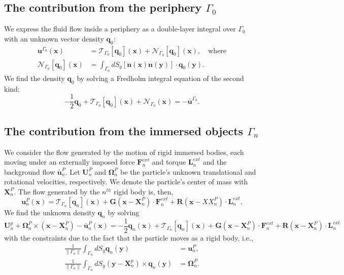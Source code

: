\documentclass{article}
\newcommand{\OOmega}{\boldsymbol{\Omega}}
\newcommand{\uu}{\mathbf{u}}
\newcommand{\UU}{\mathbf{U}}
\newcommand{\XX}{\mathbf{X}}
\newcommand{\RR}{\mathbf{R}}
\newcommand{\nn}{\mathbf{n}}
\newcommand{\xx}{\mathbf{x}}
\newcommand{\yy}{\mathbf{y}}
\newcommand{\qq}{\mathbf{q}}
\newcommand{\ubarP}{\bar{\mathbf{u}}^P}
\newcommand{\ubarG}{\bar{\mathbf{u}}^{\Gamma_0}}
\newcommand{\uG}{{\mathbf{u}}^{\Gamma_0}}
\newcommand{\FF}{\mathbf{F}}
\newcommand{\GG}{\mathbf{G}}
\newcommand{\calN}{\mathcal{N}}
\newcommand{\calT}{\mathcal{T}}
\newcommand{\LL}{\mathbf{L}}
\begin{document}
\subsection{The contribution from the periphery $\Gamma_0$}
We express the fluid flow inside a periphery as a double-layer integral over $\Gamma_0$ with an unknown vector density $\qq_0$:
\begin{align}
    \uG(\xx) & = \calT_{\Gamma_0}[\qq_0](\xx) + \calN_{\Gamma_0}[\qq_0](\xx), \quad \text{where} \\
    \calN_{\Gamma_0}[\qq_0](\xx) & = \int_{\Gamma_0}dS_y [\nn(\xx)\nn(\yy)]\cdot\qq_0(\yy).
\end{align}
We find the density $\qq_0$ by solving a Fredholm integral equation of the second kind:
\begin{equation}
    -\frac{1}{2}\qq_0 + \calT_{\Gamma_0}[\qq_0](\xx) + \calN_{\Gamma_0}(\xx) = -\ubarG.
\end{equation}


\subsection{The contribution from the immersed objects $\Gamma_n$}
We consider the flow generated by the motion of rigid immersed bodies, each moving under an externally imposed force $\FF^{ext}_n$ and torque $\LL^{ext}_n$ and the background flow $\ubarP_n$. Let $\UU^P_n$ and $\OOmega^P_n$ be the particle's unknown translational and rotational velocities, respectively. We denote the particle's center of mass with $\XX_n^P$. The flow generated by the $n^{th}$ rigid body is, then,
\begin{equation}
    \uu_n^P(\xx) = \calT_{\Gamma_n}[\qq_n](\xx) + \GG(\xx-\XX_n^P)\cdot\FF_n^{ext} + \RR(\xx-XX_n^P)\cdot\LL_n^{ext}.
\end{equation}
We find the unknown density $\qq_n$ by solving
\begin{equation}
    \UU_n^p + \OOmega_n^P \times (\xx-\XX_n^P) - \ubarP_n(\xx) = -\frac{1}{2}\qq_n(\xx)+\calT_{\Gamma_n}[\qq_n](\xx) + \GG(\xx-\XX_n^P)\cdot\FF_n^{ext} + \RR(\xx-\XX_n^P)\cdot\LL_n^{ext}
\end{equation}
with the constraints due to the fact that the particle moves as a rigid body, i.e.,
\begin{align}
  \frac{1}{\|\Gamma_n\|}\int_{\Gamma_n}dS_y \qq_n(\yy) & = \uu_n^P,\\
  \frac{1}{\|\Gamma_n\|}\int_{\Gamma_n}dS_y (\yy-\XX_n^p) \times \qq_n(\yy) & = \OOmega_n^P.
\end{align}
\end{document}

